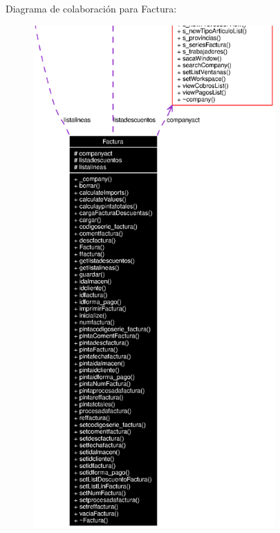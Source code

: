 Diagrama de colaboraci\'{o}n para Factura:\begin{figure}[H]
\begin{center}
\leavevmode
\includegraphics[width=262pt]{classFactura__coll__graph}
\end{center}
\end{figure}
